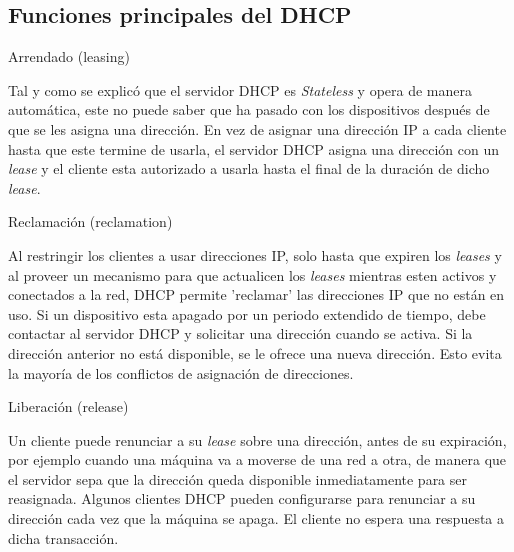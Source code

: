 \subsection{Funciones principales del DHCP} %
\label{sub:Funciones principales del DHCP}


\begin{frame}{Arrendado (leasing)} %

    Tal y como se explicó que el servidor DHCP es \textit{Stateless} y
    opera de manera automática, este no puede saber que ha pasado con los
    dispositivos después de que se les asigna una dirección. En vez de asignar una
    dirección IP a cada cliente hasta que este termine de usarla, el servidor
    DHCP asigna una dirección con un \textit{lease} y el cliente esta
    autorizado a usarla hasta el final de la duración de dicho
    \textit{lease}.\\[0.2cm]


\end{frame}

\begin{frame}{Reclamación (reclamation)} %

    Al restringir los clientes a usar direcciones IP, solo hasta que expiren
    los \textit{leases} y al proveer un mecanismo para que actualicen los
    \textit{leases} mientras esten activos y conectados a la red, DHCP permite
    'reclamar' las direcciones IP que no están en uso. Si un dispositivo esta
    apagado por un periodo extendido de tiempo, debe contactar al servidor DHCP
    y solicitar una dirección cuando se activa. Si la dirección anterior no
    está disponible, se le ofrece una nueva dirección. Esto evita la mayoría de
    los conflictos de asignación de direcciones.

\end{frame}

\begin{frame}{Liberación (release)} %

    Un cliente puede renunciar a su \textit{lease} sobre una dirección, antes
    de su expiración, por ejemplo cuando una máquina va a moverse de una red a
    otra, de manera que el servidor sepa que la dirección queda disponible
    inmediatamente para ser reasignada. Algunos clientes DHCP pueden
    configurarse para renunciar a su dirección cada vez que la máquina se
    apaga. El cliente no espera una respuesta a dicha transacción.

\end{frame}

